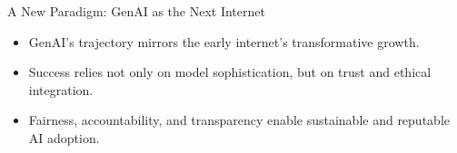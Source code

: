 \documentclass[aspectratio=169]{beamer}
\begin{document}
\begin{frame}{A New Paradigm: GenAI as the Next Internet}
\begin{itemize}
\item GenAI’s trajectory mirrors the early internet’s transformative growth.
\item Success relies not only on model sophistication, but on trust and ethical integration.
\item Fairness, accountability, and transparency enable sustainable and reputable AI adoption.
\end{itemize}
\end{frame}
\end{document}
